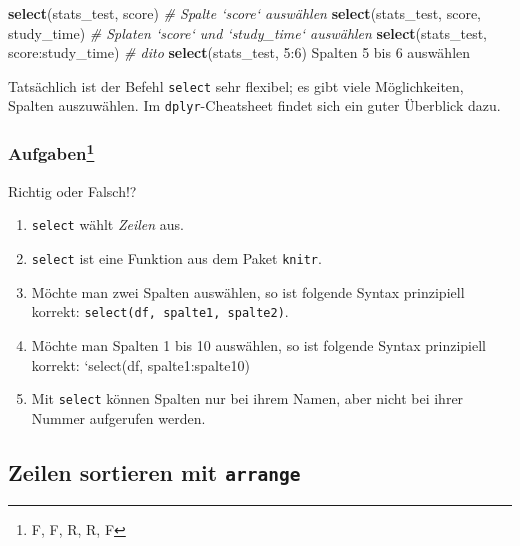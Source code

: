\documentclass[12pt,ngerman,]{book}
\newenvironment{Shaded}{\begin{snugshade}}{\end{snugshade}}
\newcommand{\KeywordTok}[1]{\textcolor[rgb]{0.13,0.29,0.53}{\textbf{{#1}}}}
\newcommand{\DecValTok}[1]{\textcolor[rgb]{0.00,0.00,0.81}{{#1}}}
\newcommand{\CommentTok}[1]{\textcolor[rgb]{0.56,0.35,0.01}{\textit{{#1}}}}
\newcommand{\NormalTok}[1]{{#1}}
\providecommand{\tightlist}{%
  \setlength{\itemsep}{0pt}\setlength{\parskip}{0pt}}
\let\rmarkdownfootnote\footnote%
\def\footnote{\protect\rmarkdownfootnote}
\renewenvironment{Shaded}{\begin{kframe}}{\end{kframe}}
\let\BeginKnitrBlock\begin \let\EndKnitrBlock\end
\begin{document}
\begin{Shaded}
\begin{Highlighting}[]
\KeywordTok{select}\NormalTok{(stats_test, score)  }\CommentTok{# Spalte `score` auswählen}
\KeywordTok{select}\NormalTok{(stats_test, score, study_time)  }\CommentTok{# Splaten `score` und `study_time` auswählen}
\KeywordTok{select}\NormalTok{(stats_test, score:study_time) }\CommentTok{# dito}
\KeywordTok{select}\NormalTok{(stats_test, }\DecValTok{5}\NormalTok{:}\DecValTok{6}\NormalTok{) Spalten }\DecValTok{5} \NormalTok{bis }\DecValTok{6} \NormalTok{auswählen}
\end{Highlighting}
\end{Shaded}

Tatsächlich ist der Befehl \texttt{select} sehr flexibel; es gibt viele
Möglichkeiten, Spalten auszuwählen. Im \texttt{dplyr}-Cheatsheet findet
sich ein guter Überblick dazu.

\subsubsection[Aufgaben]{\texorpdfstring{Aufgaben\footnote{F, F, R, R, F}}{Aufgaben}}\label{aufgaben-1}

\BeginKnitrBlock{rmdexercises}
Richtig oder Falsch!?

\begin{enumerate}
\def\labelenumi{\arabic{enumi}.}
\tightlist
\item
  \texttt{select} wählt \emph{Zeilen} aus.
\item
  \texttt{select} ist eine Funktion aus dem Paket \texttt{knitr}.
\item
  Möchte man zwei Spalten auswählen, so ist folgende Syntax prinzipiell
  korrekt: \texttt{select(df,\ spalte1,\ spalte2)}.
\item
  Möchte man Spalten 1 bis 10 auswählen, so ist folgende Syntax
  prinzipiell korrekt: `select(df, spalte1:spalte10)
\item
  Mit \texttt{select} können Spalten nur bei ihrem Namen, aber nicht bei
  ihrer Nummer aufgerufen werden.
\end{enumerate}
\EndKnitrBlock{rmdexercises}

\subsection{\texorpdfstring{Zeilen sortieren mit
\texttt{arrange}}{Zeilen sortieren mit arrange}}\label{zeilen-sortieren-mit-arrange}
\end{document}
